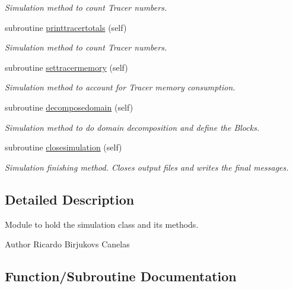 \begin{DoxyCompactItemize}
\begin{DoxyCompactList}\small\item\em Simulation method to count Tracer numbers. \end{DoxyCompactList}\item 
subroutine \mbox{\hyperlink{namespacesimulation__mod_aba126a8e0575cabb3bef6ab395002b3c}{printtracertotals}} (self)
\begin{DoxyCompactList}\small\item\em Simulation method to count Tracer numbers. \end{DoxyCompactList}\item 
subroutine \mbox{\hyperlink{namespacesimulation__mod_a54a9a06a7259eb792b9b63d2658a4170}{settracermemory}} (self)
\begin{DoxyCompactList}\small\item\em Simulation method to account for Tracer memory consumption. \end{DoxyCompactList}\item 
subroutine \mbox{\hyperlink{namespacesimulation__mod_a2b8198a9fb3f7671c6b45192a0b9740c}{decomposedomain}} (self)
\begin{DoxyCompactList}\small\item\em Simulation method to do domain decomposition and define the Blocks. \end{DoxyCompactList}\item 
subroutine \mbox{\hyperlink{namespacesimulation__mod_a4285722eaa589fa671233554b54c74f8}{closesimulation}} (self)
\begin{DoxyCompactList}\small\item\em Simulation finishing method. Closes output files and writes the final messages. \end{DoxyCompactList}\end{DoxyCompactItemize}


\subsection{Detailed Description}
Module to hold the simulation class and its methods. 

\begin{DoxyAuthor}{Author}
Ricardo Birjukovs Canelas 
\end{DoxyAuthor}


\subsection{Function/\+Subroutine Documentation}
\mbox{\label{namespacesimulation__mod_a13aa0745f4601e3f418143dab2f18276}} 
